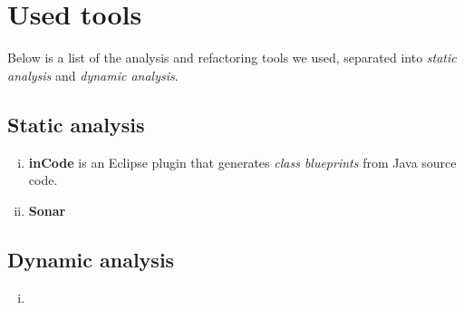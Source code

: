 \documentclass[a4paper, 10pt]{article}
\begin{document}
\newpage
\section{Used tools}
\label{sec:used_tools}

Below is a list of the analysis and refactoring tools we used,
separated into \emph{static analysis} and \emph{dynamic analysis}.

\subsection{Static analysis}
\label{sec:static_analysis}

\begin{enumerate}[i)]
\item \textbf{inCode} is an Eclipse plugin that generates \emph{class
    blueprints} from Java source code.
\item \textbf{Sonar}
\end{enumerate}

\subsection{Dynamic analysis}
\label{sec:dynamic_analysis}

\begin{enumerate}[i)]
\item \textbf{}
\end{enumerate}
\end{document}
